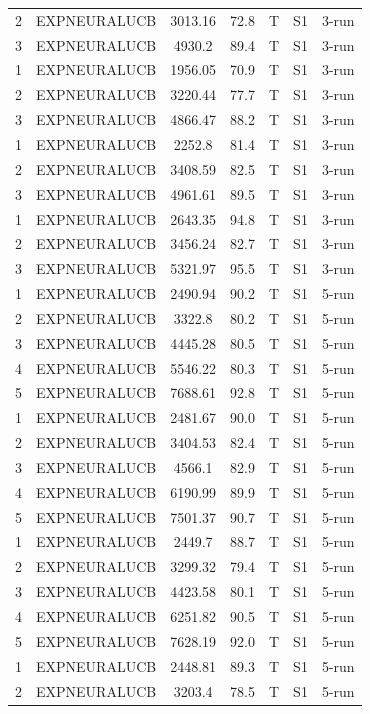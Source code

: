 \documentclass[11pt]{article}
\begin{document}
\begin{center}
\begin{longtable}{|c|c|c|c|c|c|c|}
2 & EXPNEURALUCB & 3013.16 & 72.8 & T & S1 & 3-run \\
3 & EXPNEURALUCB & 4930.2 & 89.4 & T & S1 & 3-run \\
1 & EXPNEURALUCB & 1956.05 & 70.9 & T & S1 & 3-run \\
2 & EXPNEURALUCB & 3220.44 & 77.7 & T & S1 & 3-run \\
3 & EXPNEURALUCB & 4866.47 & 88.2 & T & S1 & 3-run \\
1 & EXPNEURALUCB & 2252.8 & 81.4 & T & S1 & 3-run \\
2 & EXPNEURALUCB & 3408.59 & 82.5 & T & S1 & 3-run \\
3 & EXPNEURALUCB & 4961.61 & 89.5 & T & S1 & 3-run \\
1 & EXPNEURALUCB & 2643.35 & 94.8 & T & S1 & 3-run \\
2 & EXPNEURALUCB & 3456.24 & 82.7 & T & S1 & 3-run \\
3 & EXPNEURALUCB & 5321.97 & 95.5 & T & S1 & 3-run \\
1 & EXPNEURALUCB & 2490.94 & 90.2 & T & S1 & 5-run \\
2 & EXPNEURALUCB & 3322.8 & 80.2 & T & S1 & 5-run \\
3 & EXPNEURALUCB & 4445.28 & 80.5 & T & S1 & 5-run \\
4 & EXPNEURALUCB & 5546.22 & 80.3 & T & S1 & 5-run \\
5 & EXPNEURALUCB & 7688.61 & 92.8 & T & S1 & 5-run \\
1 & EXPNEURALUCB & 2481.67 & 90.0 & T & S1 & 5-run \\
2 & EXPNEURALUCB & 3404.53 & 82.4 & T & S1 & 5-run \\
3 & EXPNEURALUCB & 4566.1 & 82.9 & T & S1 & 5-run \\
4 & EXPNEURALUCB & 6190.99 & 89.9 & T & S1 & 5-run \\
5 & EXPNEURALUCB & 7501.37 & 90.7 & T & S1 & 5-run \\
1 & EXPNEURALUCB & 2449.7 & 88.7 & T & S1 & 5-run \\
2 & EXPNEURALUCB & 3299.32 & 79.4 & T & S1 & 5-run \\
3 & EXPNEURALUCB & 4423.58 & 80.1 & T & S1 & 5-run \\
4 & EXPNEURALUCB & 6251.82 & 90.5 & T & S1 & 5-run \\
5 & EXPNEURALUCB & 7628.19 & 92.0 & T & S1 & 5-run \\
1 & EXPNEURALUCB & 2448.81 & 89.3 & T & S1 & 5-run \\
2 & EXPNEURALUCB & 3203.4 & 78.5 & T & S1 & 5-run \\

\end{longtable}
\end{center}
\end{document}
